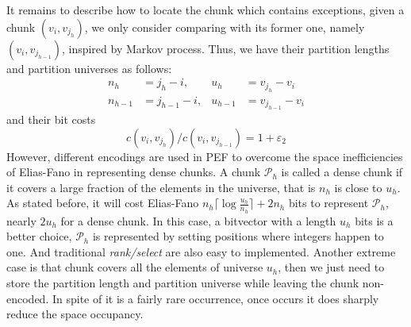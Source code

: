 \documentclass[runningheads,a4paper]{llncs}
\begin{document}
It remains to describe how to locate the chunk which contains exceptions, given a chunk $\left(v_{i}, v_{j_{h}}\right)$, we only consider comparing with its former one, namely $\left(v_{i}, v_{j_{h-1}}\right)$, inspired by Markov process.
Thus, we have their partition lengths and partition universes as follows:
\begin{align}
n_{h} &= j_{h}-i, & u_{h} &= v_{j_{h}} - v_{i} \label{equ:chunk h}\\
n_{h-1} &= j_{h-1}-i, & u_{h-1} &= v_{j_{h-1}} - v_{i}\label{equ:chunk h-1}
\end{align}
and their bit costs
\begin{equation}\label{equ:cost ratio}
{c\left(v_{i}, v_{j_{h}}\right)}/{c\left(v_{i}, v_{j_{h-1}}\right)}=1+\varepsilon_{2}
\end{equation}
However, different encodings are used in PEF to overcome the space inefficiencies of Elias-Fano in representing dense chunks.
A chunk $ \mathcal{P}_{h} $ is called a dense chunk if it covers a large fraction of the elements in the universe, that is $ n_{h} $ is close to $ u_{h} $.
As stated before, it will cost Elias-Fano $ n_{h} \lceil \log \frac{u_{h}}{n_{h}} \rceil + 2 n_{h} $ bits to represent $ \mathcal{P}_{h} $, nearly $ 2 u_{h} $ for a dense chunk.
In this case, a bitvector with a length $ u_{h} $ bits is a better choice, $ \mathcal{P}_{h} $ is represented by setting positions where integers happen to one.
And traditional \textit{rank/select} are also easy to implemented.
Another extreme case is that chunk covers all the elements of universe $ u_{h} $, then we just need to store the partition length and partition universe while leaving the chunk non-encoded.
In spite of it is a fairly rare occurrence, once occurs it does sharply reduce the space occupancy.
\end{document}
